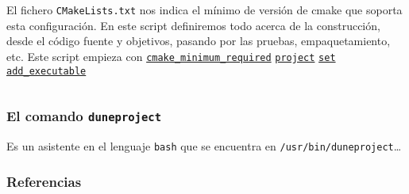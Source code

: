 





\begin{frame}[fragile]
	El fichero \lstinline{CMakeLists.txt} nos indica el mínimo de versión de cmake que soporta esta configuración.
	En este script definiremos todo acerca de la construcción, desde el código fuente y objetivos, pasando por las pruebas, empaquetamiento, etc.
	Este script empieza con
	\href{https://cmake.org/cmake/help/latest/command/cmake_minimum_required.html}{\lstinline{cmake_minimum_required}}
	\href{https://cmake.org/cmake/help/latest/command/project.html}{\lstinline{project}}
	\href{https://cmake.org/cmake/help/latest/command/set.html}{\lstinline{set}}
	\href{https://cmake.org/cmake/help/latest/command/add_executable.html}{\lstinline{add_executable}}
\end{frame}

\begin{frame}[fragile]

\inputminted{cmake}{CMakeList.txt.sample}

\end{frame}

\begin{frame}
	\frametitle{El comando \lstinline{duneproject}}
	Es un asistente en el lenguaje \lstinline{bash} que se encuentra en \lstinline{/usr/bin/duneproject}\ldots

\end{frame}

\begin{frame}\transblindsvertical
	\frametitle{Referencias}
\end{frame}


